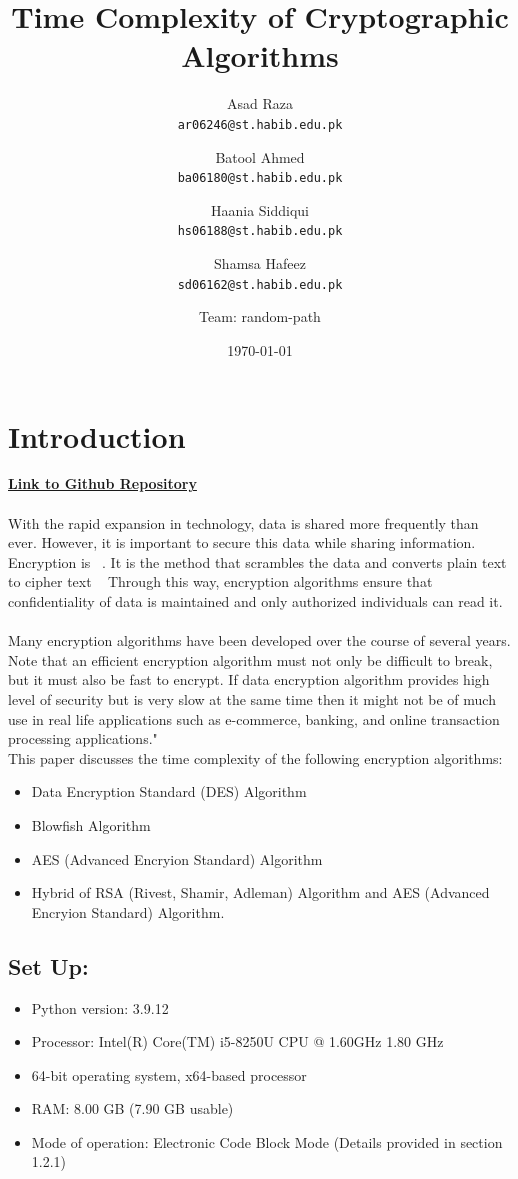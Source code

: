 \documentclass[a4paper]{report} %
\title{Time Complexity of Cryptographic Algorithms}
\author{  Asad Raza\\
  \texttt{ar06246@st.habib.edu.pk}
  \and
  Batool Ahmed\\
  \texttt{ba06180@st.habib.edu.pk}
  \and 
  Haania Siddiqui\\
  \texttt{hs06188@st.habib.edu.pk}
  \and
  Shamsa Hafeez\\
  \texttt{sd06162@st.habib.edu.pk}
  \and 
  Team: random-path \\}
\date{\today}
\begin{document}
\maketitle

\chapter{Introduction} 
\textbf{\href{https://github.com/CS-412-Spring-2022/p--p-random-path}{Link to Github Repository}}\\\\
With the rapid expansion in technology, data is shared more frequently than ever. However, it is important to secure this data while sharing information. Encryption is 
~\cite{cloudflare}. It is the method that scrambles the data and converts plain text to cipher text ~\cite{unknown} Through this way, encryption algorithms ensure that confidentiality of data is maintained and only authorized individuals can read it. ~\cite{unknown}\\

Many encryption algorithms have been developed over the course of several years. Note that an efficient encryption algorithm must not only be difficult to break, but it must also be fast to encrypt. If data encryption algorithm provides high level of security but is very slow at the same time then it might not be of much use in real life applications such as e-commerce, banking, and online transaction processing applications." ~\cite{1598556}\\

This paper discusses the time complexity of the following encryption algorithms: \\ 
\begin{itemize}
    \item Data Encryption Standard (DES) Algorithm 
    \item Blowfish Algorithm 
    \item AES (Advanced Encryion Standard) Algorithm
    \item Hybrid of RSA (Rivest, Shamir, Adleman) Algorithm and AES (Advanced Encryion Standard) Algorithm. 
\end{itemize}

\section{Set Up:}
\begin{itemize}
    \item Python version: 3.9.12
    \item Processor: Intel(R) Core(TM) i5-8250U CPU @ 1.60GHz   1.80 GHz
    \item 64-bit operating system, x64-based processor
    \item RAM: 8.00 GB (7.90 GB usable)
    \item Mode of operation: Electronic Code Block Mode (Details provided in section 1.2.1)
\end{itemize}
\end{document}
